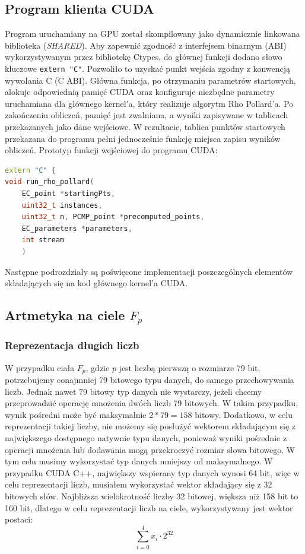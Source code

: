 \subsection{Program klienta CUDA}

Program uruchamiany na GPU został skompilowany jako dynamicznie linkowana
biblioteka (\textit{SHARED}). Aby zapewnić zgodność z interfejsem binarnym
(ABI) wykorzystywanym przez bibliotekę Ctypes, do głównej funkcji dodano
słowo kluczowe \texttt{extern "C"}.
Pozwoliło to uzyskać punkt wejścia zgodny
z konwencją wywołania C (C ABI). Główna funkcja, po otrzymaniu parametrów
startowych, alokuje odpowiednią pamięć CUDA oraz konfiguruje niezbędne
parametry uruchamiana dla głównego kernel'a, który realizuje algorytm
Rho Pollard'a. Po zakończeniu obliczeń, pamięć jest zwalniana, a wyniki
zapisywane w tablicach przekazanych jako dane wejściowe. W rezultacie,
tablica punktów startowych przekazana do programu pełni jednocześnie
funkcję miejsca zapisu wyników obliczeń.
Prototyp funkcji wejściowej do programu CUDA:
\begin{lstlisting}[language=C++]
extern "C" {
void run_rho_pollard(
    EC_point *startingPts,
    uint32_t instances,
    uint32_t n, PCMP_point *precomputed_points,
    EC_parameters *parameters,
    int stream
    )
\end{lstlisting}
Następne podrozdziały są poświęcone implementacji poszczególnych
elementów składających się na kod głównego kernel'a CUDA.


\subsection{Artmetyka na ciele $F_{p}$}
\subsubsection{Reprezentacja długich liczb}
W przypadku ciała $F_{p}$, gdzie $p$ jest liczbą pierwszą o rozmiarze 79 bit, potrzebujemy conajmniej 79 bitowego typu danych, do samego przechowywania liczb.
Jednak nawet 79 bitowy typ danych nie wystarczy, jeżeli chcemy przeprowadzić operację mnożenia
dwóch liczb 79 bitowych. W takim przypadku, wynik pośredni może być maksymalnie $2*79 = 158$ bitowy.
Dodatkowo, w celu reprezentacji takiej liczby, nie możemy się posłużyć wektorem składającym się z największego
dostępnego natywnie typu danych,
ponieważ wyniki pośrednie z operacji mnożenia lub dodawania mogą przekroczyć rozmiar słowa bitowego.
W tym celu musimy wykorzystać typ danych mniejszy od maksymalnego. W przypadku CUDA C++, największy wspierany typ danych
wynosi 64 bit, więc w celu reprezentacji liczb, musiałem wykorzystać wektor składający się z 32 bitowych słów.
Najbliższa wielokrotność liczby 32 bitowej, większa niż 158 bit to 160 bit,
dlatego w celu reprezentacji liczb na ciele, wykorzystywany jest wektor postaci:
$$
    \sum_{i = 0}^{4} x_i\cdot 2^{32}
$$

